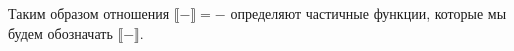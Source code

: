 \documentclass{amsart}
\theoremstyle{definition}
\theoremstyle{remark}
\renewcommand{\ll}{\llbracket}
\newcommand{\rr}{\rrbracket}
\numberwithin{figure}{section}
\begin{document}
Таким образом отношения $\ll - \rr = -$ определяют частичные функции, которые мы будем обозначать $\ll - \rr$.

\begin{comment}
\begin{lem}[correctness-subst][Correctness of the substitution]
Пусть $\ll \Gamma \vdash a : A \rr = a : A \dotsb \Gamma$.
Тогда верны следующие утверждения:
\begin{enumerate}
\item Если $\ll \Gamma, x : A, \Delta \vdash \rr = D$, то 
\item Если $\ll \Gamma, x : A, \Delta \vdash B \rr = B \dotsb D$
\end{enumerate}
\end{lem}
\end{comment}
\end{document}
